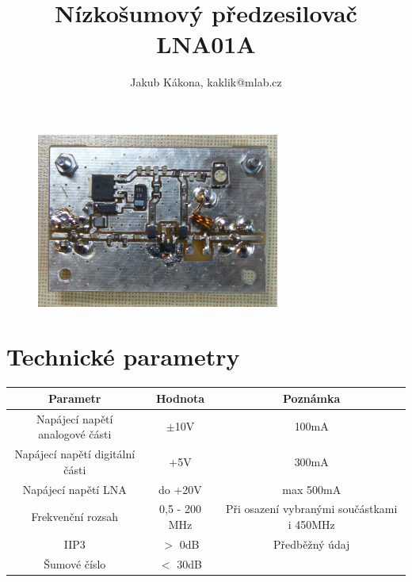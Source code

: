 \documentclass[12pt,a4paper,twoside]{article}
\begin{document}
\title{Nízkošumový předzesilovač LNA01A}
\author{Jakub Kákona, kaklik@mlab.cz}
\maketitle

\thispagestyle{empty}
\begin{abstract}
\end{abstract}

\begin{figure} [htbp]
\begin{center}
\includegraphics [width=80mm] {LNA01A_Bottom_Big.JPG} 
\end{center}
\end{figure}

\tableofcontents


\section{Technické parametry}
\begin{table}[htbp]
\begin{center}
\begin{tabular}{|c|c|c|}
\hline
\multicolumn{1}{|c|}{Parametr} & \multicolumn{1}{|c|}{Hodnota} & \multicolumn{1}{|c|}{Poznámka} \\ \hline
Napájecí napětí analogové části & $\pm$10V &  100mA \\ \hline
Napájecí napětí digitální části & +5V &  300mA \\ \hline
Napájecí napětí LNA & do +20V &  max 500mA \\ \hline
Frekvenční rozsah  & 0,5 - 200 MHz & Při osazení vybranými součástkami i 450MHz \\ \hline
IIP3  & $>$ 0dB & Předběžný údaj \\ \hline
Šumové číslo  & $<$ 30dB & \\ \hline
\end{tabular}
\end{center}
\end{table}
\end{document}
